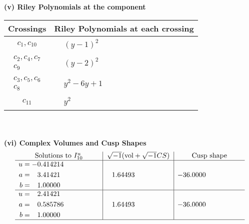 \documentclass[1p]{elsarticle_modified}
\theoremstyle{definition}
\newcommand{\I}{\sqrt{-1}}
\begin{document}
\newpage\renewcommand{\arraystretch}{1}
\flushleft \textbf{(v) Riley Polynomials at the component}\newline \\
\begin{tabular}{m{50pt}|m{274pt}}
Crossings & \hspace{64pt}Riley Polynomials at each crossing \\
\hline $$\begin{aligned}c_{1},c_{10}\end{aligned}$$&$\begin{aligned}
&(y-1)^2
\end{aligned}$\\
\hline $$\begin{aligned}c_{2},c_{4},c_{7}\\c_{9}\end{aligned}$$&$\begin{aligned}
&(y-2)^2
\end{aligned}$\\
\hline $$\begin{aligned}c_{3},c_{5},c_{6}\\c_{8}\end{aligned}$$&$\begin{aligned}
&y^2-6 y+1
\end{aligned}$\\
\hline $$\begin{aligned}c_{11}\end{aligned}$$&$\begin{aligned}
&y^2
\end{aligned}$\\
\hline
\end{tabular}\\~\\
\newpage\flushleft \textbf{(vi) Complex Volumes and Cusp Shapes}
$$\begin{array}{c|c|c}  
\text{Solutions to }I^u_{10}& \I (\text{vol} + \sqrt{-1}CS) & \text{Cusp shape}\\
 \hline 
\begin{aligned}
u &= -0.414214\phantom{ +0.000000I} \\
a &= \phantom{-}3.41421\phantom{ +0.000000I} \\
b &= \phantom{-}1.00000\phantom{ +0.000000I}\end{aligned}
 & \phantom{-}1.64493\phantom{ +0.000000I} & -36.0000\phantom{ +0.000000I} \\ \hline\begin{aligned}
u &= \phantom{-}2.41421\phantom{ +0.000000I} \\
a &= \phantom{-}0.585786\phantom{ +0.000000I} \\
b &= \phantom{-}1.00000\phantom{ +0.000000I}\end{aligned}
 & \phantom{-}1.64493\phantom{ +0.000000I} & -36.0000\phantom{ +0.000000I}\\
 \hline 
 \end{array}$$\newpage\newpage\renewcommand{\arraystretch}{1}
\end{document}
